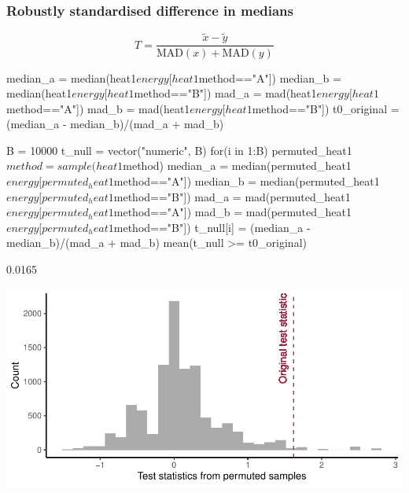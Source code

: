\documentclass[a4paper]{article}\usepackage[]{graphicx}\usepackage[]{xcolor}
\makeatletter
\def\maxwidth{ %
  \ifdim\Gin@nat@width>\linewidth
    \linewidth
  \else
    \Gin@nat@width
  \fi
}
\makeatother
\begin{document}
\subsubsection{Robustly standardised difference in medians}
\[
	T = \frac{\widetilde{x} - \widetilde{y}}{\mathrm{MAD}(x) + \mathrm{MAD}(y)}
\]
\begin{Schunk}
\begin{Sinput}
median_a = median(heat1$energy[heat1$method=="A"])
median_b = median(heat1$energy[heat1$method=="B"])
mad_a = mad(heat1$energy[heat1$method=="A"])
mad_b = mad(heat1$energy[heat1$method=="B"])
t0_original = (median_a - median_b)/(mad_a + mad_b)

B = 10000
t_null = vector("numeric", B)
for(i in 1:B){
  permuted_heat1$method = sample(heat1$method)
  median_a = median(permuted_heat1$energy[permuted_heat1$method=="A"])
  median_b = median(permuted_heat1$energy[permuted_heat1$method=="B"])
  mad_a = mad(permuted_heat1$energy[permuted_heat1$method=="A"])
  mad_b = mad(permuted_heat1$energy[permuted_heat1$method=="B"])
  t_null[i] = (median_a - median_b)/(mad_a + mad_b)
}
mean(t_null >= t0_original)
\end{Sinput}
\begin{Soutput}
[1] 0.0165
\end{Soutput}
\end{Schunk}
\begin{Schunk}


{\centering \includegraphics[width=\maxwidth]{figure/listings-unnamed-chunk-160-1} 

}

\end{Schunk}
\end{document}

